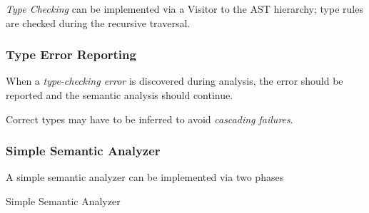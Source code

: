 \begin{definition}
    \textit{Type Checking} can be implemented via a Visitor to the AST hierarchy; type rules are checked during the recursive traversal.
\end{definition}

\subsubsection{Type Error Reporting}

\begin{definition}
    When a \textit{type-checking error} is discovered during analysis, the error should be reported and the semantic analysis should continue.
    
    Correct types may have to be inferred to avoid \textit{cascading failures}.
\end{definition}

\subsubsection{Simple Semantic Analyzer}

\begin{definition}
    A simple semantic analyzer can be implemented via two phases
    
    \begin{algorithm}[H]
        \begin{algorithmic}[1]
                    \State {}
                    \State {}
                \EndFor
                    \State {}
                    \State {}
                \EndFor
            \EndProcedure
                    \State {}
                        \State {}
                    \EndIf
                \EndFor
            \EndProcedure
                    \State {}
                    \State {}
                \EndFor
            \EndProcedure
        \end{algorithmic}
        \caption{Simple Semantic Analyzer}
        \label{algo:simple-semantic-analyzer}
    \end{algorithm}
\end{definition}

